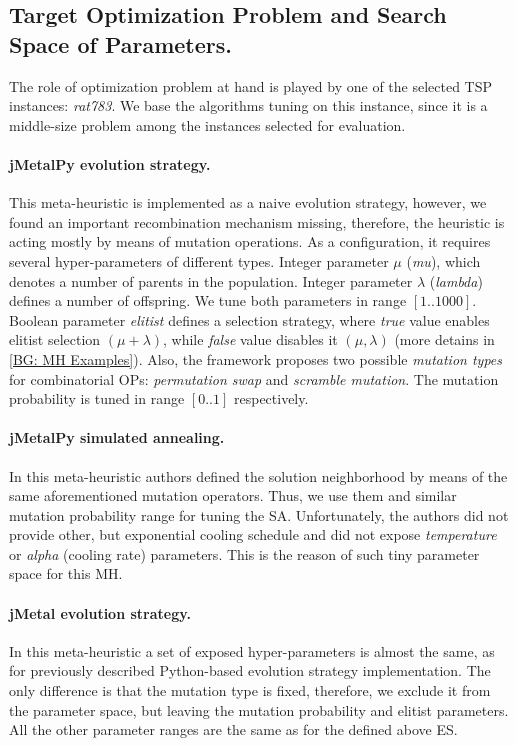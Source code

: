 \subsection{Target Optimization Problem and Search Space of Parameters.} 
The role of optimization problem at hand is played by one of the selected TSP instances: \emph{rat783}. We base the algorithms tuning on this instance, since it is a middle-size problem among the instances selected for evaluation.

\paragraph{jMetalPy evolution strategy.} This meta-heuristic is implemented as a naive evolution strategy, however, we found an important recombination mechanism missing, therefore, the heuristic is acting mostly by means of mutation operations. As a configuration, it requires several hyper-parameters of different types. Integer parameter $\mu$ (\emph{mu}), which denotes a number of parents in the population. Integer parameter $\lambda$ (\emph{lambda}) defines a number of offspring. We tune both parameters in range $[1..1000]$. Boolean parameter \emph{elitist} defines a selection strategy, where \emph{true} value enables elitist selection $(\mu+\lambda)$, while \emph{false} value disables it $(\mu,\lambda)$ (more detains in \cref{BG: MH Examples}). Also, the framework proposes two possible \emph{mutation types} for combinatorial OPs: \emph{permutation swap} and \emph{scramble mutation}. The mutation probability is tuned in range $[0..1]$ respectively.

\paragraph{jMetalPy simulated annealing.} In this meta-heuristic authors defined the solution neighborhood by means of the same aforementioned mutation operators. Thus, we use them and similar mutation probability range for tuning the SA. Unfortunately, the authors did not provide other, but exponential cooling schedule and did not expose \emph{temperature} or \emph{alpha} (cooling rate) parameters. This is the reason of such tiny parameter space for this MH.

\paragraph{jMetal evolution strategy.} In this meta-heuristic a set of exposed hyper-parameters is almost the same, as for previously described Python-based evolution strategy implementation. The only difference is that the mutation type is fixed, therefore, we exclude it from the parameter space, but leaving the mutation probability and elitist parameters. All the other parameter ranges are the same as for the defined above ES.


